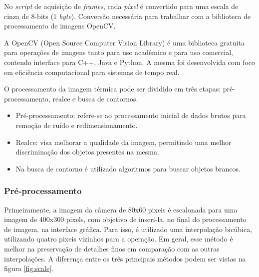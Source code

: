 		No \textit{script} de aquisição de \textit{frames}, cada \textit{pixel} é convertido para uma escala de cinza de 8-bits (1 \textit{byte}). Conversão necessária para trabalhar com a biblioteca de processamento de imagens OpenCV.
		    
		A OpenCV (Open Source Computer Vision Library) é uma biblioteca gratuita para operações de imagens tanto para uso acadêmico e para uso comercial, contendo interface para C++, Java e Python. A mesma foi desenvolvida com foco em eficiência computacional para sistemas de tempo real.

		O processamento da imagem térmica pode ser dividido em três etapas:  pré-processamento, realce e busca de contornos.
		
		\begin{itemize}
			\item Pré-processamento: refere-se ao processamento inicial de dados brutos para remoção de ruído e redimensionamento.
			\item Realce: visa melhorar a qualidade da imagem, permitindo uma melhor discriminação dos objetos presentes na mesma.
			\item Na busca de contorno é utilizado algoritmos para buscar objetos brancos.
		\end{itemize}
		
		\subsubsection{Pré-processamento}
		
		Primeiramente, a imagem da câmera de 80x60 pixeis é escalonada para uma imagem de 400x300 pixels, com objetivo de inseri-la, no final do processamento de imagem, na interface gráfica. Para isso, é utilizado uma interpolação bicúbica, utilizando quatro pixeis vizinhos para a operação. Em geral, esse método é melhor na preservação de detalhes finos em comparação com as outras interpolações. A diferença entre os três principais métodos podem ser vistas na figura \ref{fig:scale}.

